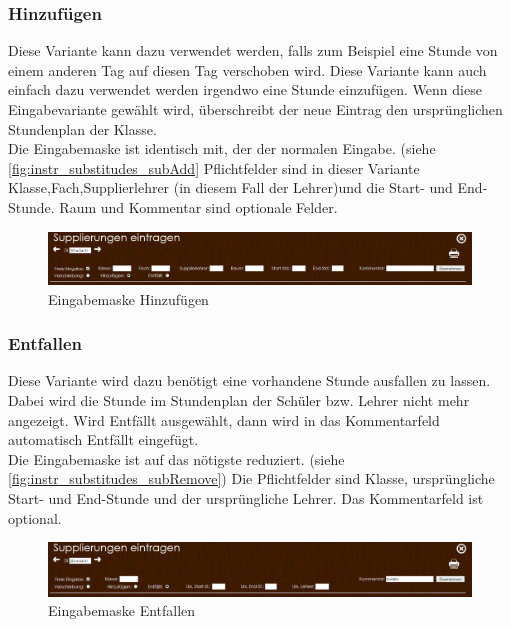\subsubsection{Hinzufügen}\label{sec:instr_admin_sub_add}
Diese Variante kann dazu verwendet werden, falls zum Beispiel eine Stunde von einem anderen Tag auf diesen Tag verschoben wird. Diese Variante kann auch einfach dazu verwendet werden irgendwo eine Stunde einzufügen. Wenn diese Eingabevariante gewählt wird, überschreibt der neue Eintrag den ursprünglichen Stundenplan der Klasse.\\
Die Eingabemaske ist identisch mit, der der normalen Eingabe. (siehe \autoref{fig:instr_substitudes_subAdd} Pflichtfelder sind in dieser Variante Klasse,Fach,Supplierlehrer (in diesem Fall der Lehrer)und die Start- und End-Stunde. Raum und Kommentar sind optionale Felder.
\begin{figure}[H]
\centering
\includegraphics[keepaspectratio=true, width=17cm]{images/screenshots/substitudes_add.png}
\caption{Eingabemaske Hinzufügen}
\label{fig:instr_substitudes_subAdd}
\end{figure}
\subsubsection{Entfallen}\label{sec:instr_admin_sub_remove}
Diese Variante wird dazu benötigt eine vorhandene Stunde ausfallen zu lassen. Dabei wird die Stunde im Stundenplan der Schüler bzw. Lehrer nicht mehr angezeigt. Wird Entfällt ausgewählt, dann wird in das Kommentarfeld automatisch Entfällt eingefügt.\\
Die Eingabemaske ist auf das nötigste reduziert. (siehe \autoref{fig:instr_substitudes_subRemove}) Die Pflichtfelder sind Klasse, ursprüngliche Start- und End-Stunde und der ursprüngliche Lehrer. Das Kommentarfeld ist optional.
\begin{figure}[H]
\centering
\includegraphics[keepaspectratio=true, width=17cm]{images/screenshots/substitudes_remove.png}
\caption{Eingabemaske Entfallen}
\label{fig:instr_substitudes_subRemove}
\end{figure}

